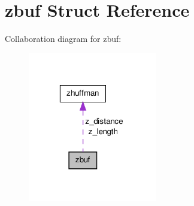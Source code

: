 \hypertarget{structzbuf}{\section{zbuf Struct Reference}
\label{structzbuf}
}


Collaboration diagram for zbuf\-:\nopagebreak
\begin{figure}[H]
\begin{center}
\leavevmode
\includegraphics[width=159pt]{structzbuf__coll__graph}
\end{center}
\end{figure}

